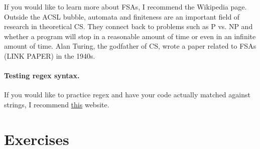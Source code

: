 \documentclass[10pt]{article}
\begin{document}
If you would like to learn more about FSAs, I recommend the Wikipedia page.
Outside the ACSL bubble, automata and finiteness
are an important field of research in theoretical CS\@.
They connect back to problems such as P vs. NP and whether a program
will stop in a reasonable amount of time or even in an infinite amount of time.
Alan Turing, the godfather of CS, wrote a paper related to FSAs (LINK PAPER) in the 1940s.

\paragraph{Testing regex syntax.}
If you would like to practice regex and have your code actually
matched against strings, I recommend \href{https://regexr.com/}{this} website.

\section{Exercises}
\end{document}
